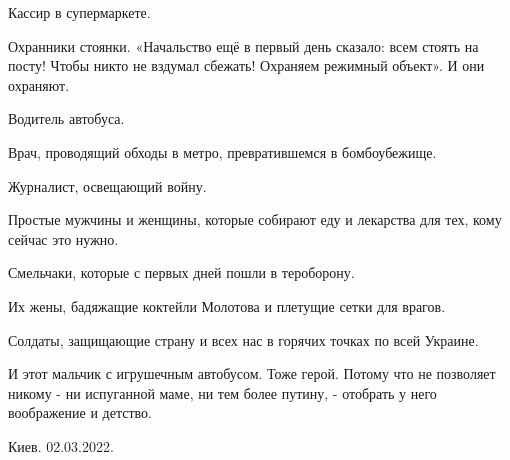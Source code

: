 Кассир в супермаркете. 

Охранники стоянки. «Начальство ещё в первый день сказало: всем стоять на посту!
Чтобы никто не вздумал сбежать! Охраняем режимный объект». И они охраняют. 

Водитель автобуса. 

Врач, проводящий обходы в метро, превратившемся в бомбоубежище. 

Журналист, освещающий войну. 

Простые мужчины и женщины, которые собирают еду и лекарства для тех, кому
сейчас это нужно.

Смельчаки, которые с первых дней пошли в тероборону.

Их жены, бадяжащие коктейли Молотова и плетущие сетки для врагов.

Солдаты, защищающие страну и всех нас в горячих точках по всей Украине.

И этот мальчик с игрушечным автобусом. Тоже герой. Потому что не позволяет
никому - ни испуганной маме, ни тем более путину, - отобрать у него воображение
и детство.

Киев. 02.03.2022.

